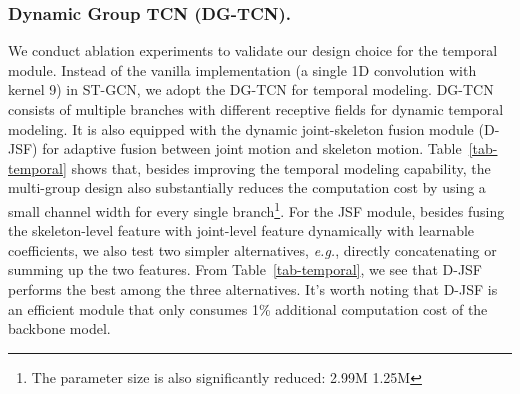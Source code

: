 \subsubsection{Dynamic Group TCN (DG-TCN). }
We conduct ablation experiments to validate our design choice for the temporal module. 
Instead of the vanilla implementation (a single 1D convolution with kernel 9) in ST-GCN, we adopt the DG-TCN for temporal modeling.
DG-TCN consists of multiple branches with different receptive fields for dynamic temporal modeling.
It is also equipped with the dynamic joint-skeleton fusion module (D-JSF) for adaptive fusion between joint motion and skeleton motion. 
Table~\ref{tab-temporal} shows that, besides improving the temporal modeling capability, the multi-group design also substantially reduces the computation cost by using a small channel width for every single branch\footnote{The parameter size is also significantly reduced: 2.99M  1.25M}. 
For the JSF module, besides fusing the skeleton-level feature with joint-level feature dynamically with learnable coefficients, 
we also test two simpler alternatives, \emph{e.g.}, directly concatenating or summing up the two features. 
From Table~\ref{tab-temporal}, we see that D-JSF performs the best among the three alternatives. 
It's worth noting that D-JSF is an efficient module that only consumes 1\% additional computation cost of the backbone model. 

\begin{table}[t]
    \captionsetup{font=small, position=top}
	\centering 
    \caption{\textbf{Validating Uniform Sampling and two alternatives adopted in previous works on multiple backbones. 
     denotes the gain from Uniform Sampling compared to the baseline without temporal augmentation. }}
    \vspace{1mm}
	\label{tab-aug}
    \vspace{-6mm}
\end{table}

